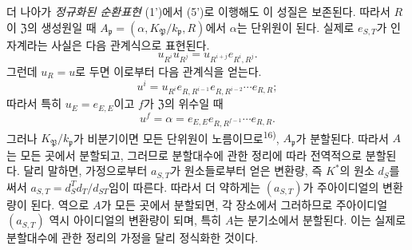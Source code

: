 
더 나아가 \emph{정규화된 순환표현} (1')에서 (5')로 이행해도 이 성질은 보존된다. 따라서 \(R\)이 \(\mathfrak Z\)의 생성원일 때 \(A_{\mathfrak p}=(\alpha,K_{\mathfrak P}/k_{\mathfrak p},R)\)에서 \(\alpha\)는 단위원이 된다. 실제로 \(e_{S,T}\)가 인자계라는 사실은 다음 관계식으로 표현된다.
\[
u_{R^i}u_{R^j}=u_{R^{i+j}}e_{R^i,R^j}.
\]
그런데 \(u_R=u\)로 두면 이로부터 다음 관계식을 얻는다.
\[
u^i=u_{R^i}e_{R,R^{i-1}}e_{R,R^{i-2}}\cdots e_{R,R};
\]
따라서 특히 \(u_E=e_{E,E}\)이고 \(f\)가 \(\mathfrak Z\)의 위수일 때
\[
u^f=\alpha=e_{E,E}e_{R,R^{f-1}}\cdots e_{R,R}.
\]
그러나 \(K_{\mathfrak P}/k_{\mathfrak p}\)가 비분기이면 모든 단위원이 노름이므로\textsuperscript{16)}, \(A_{\mathfrak p}\)가 분할된다. 따라서 \(A\)는 모든 곳에서 분할되고, 그러므로 분할대수에 관한 정리에 따라 전역적으로 분할된다. 달리 말하면, 가정으로부터 \(a_{S,T}\)가 원소들로부터 얻은 변환량, 즉 \(K^*\)의 원소 \(d_S\)를 써서 \(a_{S,T}=d_S^Td_T/d_{ST}\)임이 따른다. 따라서 더 약하게는 \((a_{S,T})\)가 주아이디얼의 변환량이 된다. 역으로 \(A\)가 모든 곳에서 분할되면, 각 장소에서 그러하므로 주아이디얼 \((a_{S,T})\) 역시 아이디얼의 변환량이 되며, 특히 \(A\)는 분기소에서 분할된다. 이는 실제로 분할대수에 관한 정리의 가정을 달리 정식화한 것이다.
